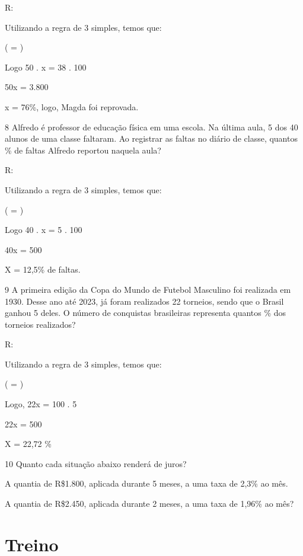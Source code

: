 {R:

Utilizando a regra de 3 simples, temos que:

( = )

Logo 50 . x = 38 . 100

50x = 3.800

x = 76\%, logo, Magda foi reprovada.

\num{8} Alfredo é professor de educação física em uma escola. Na última aula,
5 dos 40 alunos de uma classe faltaram. Ao registrar as faltas no diário
de classe, quantos \% de faltas Alfredo reportou naquela aula?

R:

Utilizando a regra de 3 simples, temos que:

( = )

Logo 40 . x = 5 . 100

40x = 500

X = 12,5\% de faltas.

\num{9} A primeira edição da Copa do Mundo de Futebol Masculino foi realizada
em 1930. Desse ano até 2023, já foram realizados 22 torneios, sendo que
o Brasil ganhou 5 deles. O número de conquistas brasileiras representa
quantos \% dos torneios realizados?

R:

Utilizando a regra de 3 simples, temos que:

( = )

Logo, 22x = 100 . 5

22x = 500

X = 22,72 \%

\num{10} Quanto cada situação abaixo renderá de juros?

\item A quantia de R\$1.800, aplicada durante 5 meses, a uma taxa de 2,3\%
ao mês.


\item A quantia de R\$2.450, aplicada durante 2 meses, a uma taxa de 1,96\% ao mês?


\section{Treino}

}

